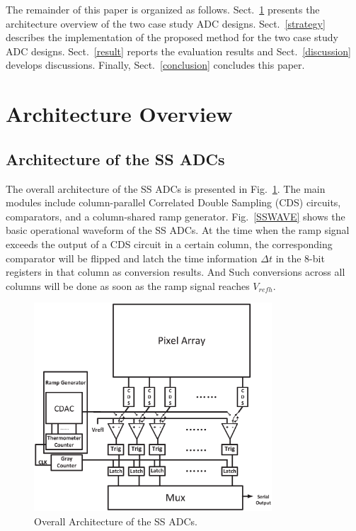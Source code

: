 \documentclass[conference]{IEEEtran}
\begin{document}
The remainder of this paper is organized as follows. 
Sect.~\ref{architecture} presents the architecture overview of the two case study ADC designs. 
Sect.~\ref{strategy} describes the implementation of the proposed method for the two case study ADC designs. 
Sect.~\ref{result} reports the evaluation results and Sect.~\ref{discussion} develops discussions. 
Finally, Sect.~\ref{conclusion} concludes this paper.

\section{Architecture Overview}\label{architecture}

\subsection{Architecture of the SS ADCs}

The overall architecture of the SS ADCs is presented in Fig.~\ref{SSADC}. The main modules include column-parallel Correlated Double Sampling (CDS) circuits, comparators, 
and a column-shared ramp generator. Fig.~\ref{SSWAVE} shows the basic operational waveform of the SS ADCs. At the time when the ramp signal exceeds the output of a CDS circuit in a certain column, 
the corresponding comparator will be flipped and latch the time information $\Delta t$ in the 8-bit registers in that column as conversion results. 
And Such conversions across all columns will be done as soon as the ramp signal reaches $V_{refh}$.

\begin{figure}[htbp]
	\centerline{\includegraphics[width=3.5in]{./Figures/SSADC.eps}}
	\caption{Overall Architecture of the SS ADCs.}
	\label{SSADC}
\end{figure} 
\end{document}
